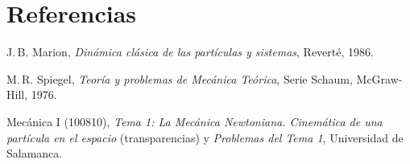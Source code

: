 \section{Referencias}
\label{sec:referencias}

\begin{enumerate}[label={\textcolor{cian}{[\arabic*]}},leftmargin=2.2em,itemsep=1ex]
  \item J.\,B. Marion, \emph{Dinámica clásica de las partículas y sistemas},
        Reverté, 1986.
  \item M.\,R. Spiegel, \emph{Teoría y problemas de Mecánica Teórica},
        Serie Schaum, McGraw-Hill, 1976.
  \item Mecánica I (100810), \emph{Tema 1: La Mecánica Newtoniana. Cinemática
        de una partícula en el espacio} (transparencias) y \emph{Problemas del
        Tema 1}, Universidad de Salamanca.
\end{enumerate}
